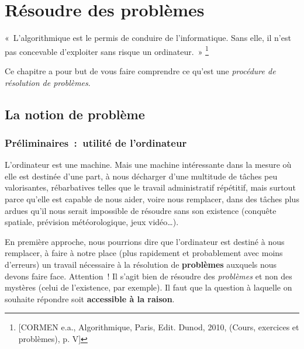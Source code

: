 \chapter{Résoudre des problèmes}

	\begin{Exergue}
		«~L’algorithmique est le permis de conduire de l’informatique.
		Sans elle, il n’est pas concevable d’exploiter sans risque un ordinateur.~»
		\footnote{[CORMEN e.a., Algorithmique, Paris, Edit. Dunod, 2010, (Cours, 
		exercices et problèmes), p. V] }
	\end{Exergue}

	Ce chapitre a pour but
	de vous faire comprendre ce qu'est une 
	\emph{procédure de résolution de problèmes}.

	\section{La notion de problème}
	
		\subsection{Préliminaires~:~utilité de l’ordinateur}
		
			L’ordinateur est une machine. 
			Mais une machine intéressante dans la mesure 
			où elle est destinée d’une part, 
			à nous décharger d’une multitude de tâches peu valorisantes, 
			rébarbatives telles que le travail administratif répétitif, 
			mais surtout parce qu’elle est capable de nous aider, 
			voire nous remplacer, dans des tâches plus ardues 
			qu’il nous serait impossible de résoudre sans son existence 
			(conquête spatiale, prévision météorologique, jeux vidéo\dots).
			
			En première approche, 
			nous pourrions dire que l’ordinateur 
			est destiné à nous remplacer, 
			à faire à notre place 
			(plus rapidement et probablement avec moins d’erreurs) 
			un travail nécessaire à la résolution de \textbf{problèmes} 
			auxquels nous devons faire face. 
			Attention~! Il s’agit bien de résoudre des \textit{problèmes} 
			et non des mystères (celui de l’existence, par exemple). 
			Il faut que la question à laquelle
			on souhaite répondre soit \textbf{accessible à la raison}.
	
